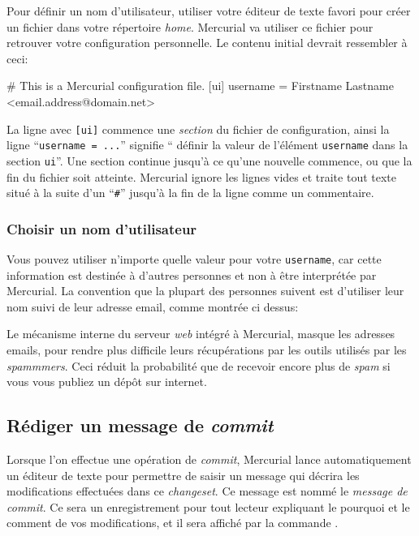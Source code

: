 Pour définir un nom d'utilisateur, utiliser votre éditeur de texte favori
pour créer un fichier  dans votre répertoire \textit{home}.
Mercurial va utiliser ce fichier pour retrouver votre configuration personnelle.
Le contenu initial devrait ressembler à ceci:
\begin{codesample2}
  # This is a Mercurial configuration file.
  [ui]
  username = Firstname Lastname <email.address@domain.net>
\end{codesample2}
La ligne avec \texttt{[ui]} commence une \emph{section} du fichier de
configuration, ainsi la ligne ``\texttt{username = ...}'' signifie ``
définir la valeur de l'élément \texttt{username} dans la section 
\texttt{ui}''. Une section continue jusqu'à ce qu'une nouvelle 
commence, ou que la fin du fichier soit atteinte. Mercurial ignore
les lignes vides et traite tout texte situé à la suite d'un  
``\texttt{\#}'' jusqu'à la fin de la ligne comme un commentaire.

\subsubsection{Choisir un nom d'utilisateur}

Vous pouvez utiliser n'importe quelle valeur pour votre \texttt{username},
car cette information est destinée à d'autres personnes et non à être
interprétée par Mercurial. La convention que la plupart des personnes
suivent est d'utiliser leur nom suivi de leur adresse email,
comme montrée ci dessus:

\begin{note}
  Le mécanisme interne du serveur \textit{web} intégré à Mercurial,
  masque les adresses emails, pour rendre plus difficile leurs
  récupérations par les outils utilisés par les \textit{spammmers}.
  Ceci réduit la probabilité que de recevoir encore plus de 
  \textit{spam} si vous vous publiez un dépôt sur internet.
\end{note}

\subsection{Rédiger un message de \textit{commit}}

Lorsque l'on effectue une opération de \textit{commit}, Mercurial 
lance automatiquement un éditeur de texte pour permettre de saisir
un message qui décrira les modifications effectuées dans ce 
\textit{changeset}. Ce message est nommé le \emph{message de 
\textit{commit}}. Ce sera un enregistrement pour tout lecteur 
expliquant le pourquoi et le comment de vos modifications, et il sera
affiché par la commande .

